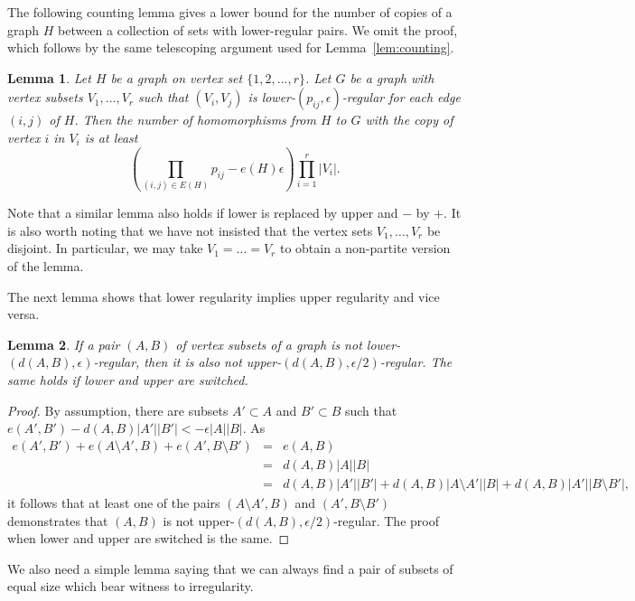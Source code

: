 \documentclass[11pt]{article}
\newtheorem{lemma}{Lemma}[section]
\begin{document}
The following counting lemma gives a lower bound for the number of copies of a graph $H$ between a collection of sets with lower-regular pairs. We omit the proof, which follows by the same telescoping argument used for Lemma~\ref{lem:counting}.

\begin{lemma}\label{countlemma}
Let $H$ be a graph on vertex set $\{1,2,\ldots,r\}$. Let $G$ be a graph with vertex subsets $V_1,\ldots,V_r$ such that $(V_i,V_j)$ is lower-$(p_{ij},\epsilon)$-regular for each edge $(i,j)$ of $H$. Then the number of homomorphisms from $H$ to $G$ with the copy of vertex $i$ in $V_i$ is at least $$\left(\prod_{(i,j) \in E(H)}p_{ij} -e(H)\epsilon\right)\prod_{i=1}^r |V_i|.$$
\end{lemma}

Note that a similar lemma also holds if lower is replaced by upper and $-$ by $+$. It is also worth noting that we have not insisted that the vertex sets $V_1, \dots, V_r$ be disjoint. In particular, we may take $V_1 = \dots = V_r$ to obtain a non-partite version of the lemma.

The next lemma shows that lower regularity implies upper regularity and vice versa.

\begin{lemma}\label{lowervsupper}
If a pair $(A,B)$ of vertex subsets of a graph is not lower-$(d(A,B),\epsilon)$-regular, then it is also not upper-$(d(A,B),\epsilon/2)$-regular. The same holds if lower and upper are switched.
\end{lemma}
\begin{proof}
By assumption, there are subsets $A' \subset A$ and $B' \subset B$ such that $e(A',B')-d(A,B)|A'||B'|<-\epsilon|A||B|$. As \begin{eqnarray*}e(A',B')+e(A \setminus A',B)+e(A',B \setminus B') & = & e(A,B)\\ & = & d(A, B) |A||B|\\ & = & d(A,B)|A'||B'|+d(A,B)|A \setminus A'||B|+d(A,B)|A'||B \setminus B'|,\end{eqnarray*} it follows that at least one of the pairs $(A \setminus A',B)$ and $(A',B \setminus B')$ demonstrates that $(A,B)$ is not upper-$(d(A,B),\epsilon/2)$-regular. The proof when lower and upper are switched is the same.
\end{proof}

We also need a simple lemma saying that we can always find a pair of subsets of equal size which bear witness to irregularity. 
\end{document}
